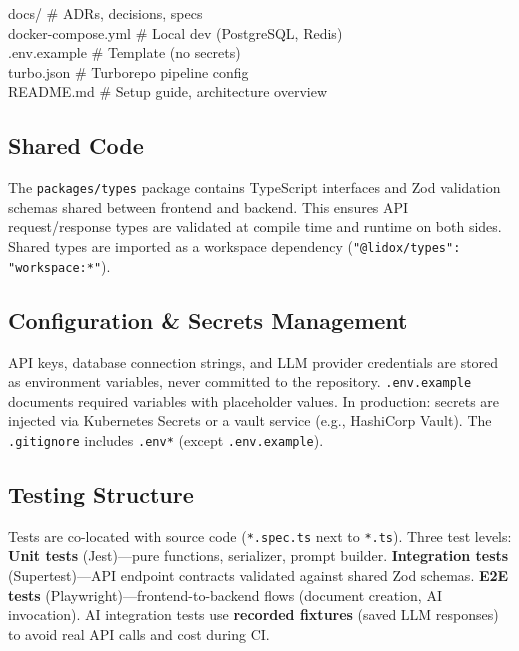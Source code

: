 \documentclass[10pt, a4paper]{article}
\begin{document}
{{\color{codeFg}\hspace*{1em}docs/ \hfill \color{inkFaint}\# ADRs, decisions, specs\\
\color{codeFg}\hspace*{1em}docker-compose.yml \hfill \color{inkFaint}\# Local dev (PostgreSQL, Redis)\\
\color{codeFg}\hspace*{1em}.env.example \hfill \color{inkFaint}\# Template (no secrets)\\
\color{codeFg}\hspace*{1em}turbo.json \hfill \color{inkFaint}\# Turborepo pipeline config\\
\color{codeFg}\hspace*{1em}README.md \hfill \color{inkFaint}\# Setup guide, architecture overview%
}}\vspace{4pt}

\subsection{Shared Code}
The \texttt{packages/types} package contains TypeScript interfaces and Zod validation schemas shared between frontend and backend. This ensures API request/response types are validated at compile time and runtime on both sides. Shared types are imported as a workspace dependency (\texttt{"@lidox/types": "workspace:*"}).

\subsection{Configuration \& Secrets Management}
API keys, database connection strings, and LLM provider credentials are stored as environment variables, never committed to the repository. \texttt{.env.example} documents required variables with placeholder values. In production: secrets are injected via Kubernetes Secrets or a vault service (e.g., HashiCorp Vault). The \texttt{.gitignore} includes \texttt{.env*} (except \texttt{.env.example}).

\subsection{Testing Structure}
Tests are co-located with source code (\texttt{*.spec.ts} next to \texttt{*.ts}). Three test levels: \textbf{Unit tests} (Jest)---pure functions, serializer, prompt builder. \textbf{Integration tests} (Supertest)---API endpoint contracts validated against shared Zod schemas. \textbf{E2E tests} (Playwright)---frontend-to-backend flows (document creation, AI invocation). AI integration tests use \textbf{recorded fixtures} (saved LLM responses) to avoid real API calls and cost during CI.
\end{document}

